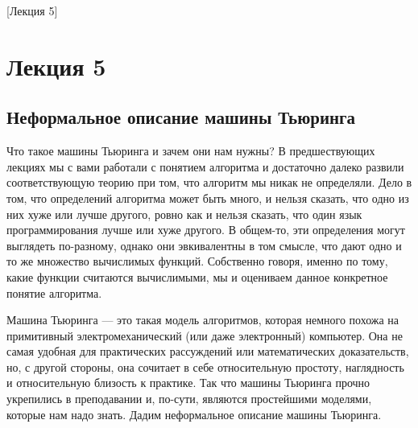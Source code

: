[Лекция 5]

\section{Лекция 5}

\subsection{Неформальное описание машины Тьюринга}

Что такое машины Тьюринга и зачем они нам нужны?
В предшествующих лекциях мы с вами работали с понятием алгоритма и достаточно далеко развили соответствующую теорию при том, что алгоритм мы никак не определяли.
Дело в том, что определений алгоритма может быть много, и нельзя сказать, что одно из них хуже или лучше другого, ровно как и нельзя сказать, что один язык программирования лучше или хуже другого.
В общем-то, эти определения могут выглядеть по-разному, однако они эвкивалентны в том смысле, что дают одно и то же множество вычислимых функций.
Собственно говоря, именно по тому, какие функции считаются вычислимыми, мы и оцениваем данное конкретное понятие алгоритма.

Машина Тьюринга --- это такая модель алгоритмов, которая немного похожа на примитивный электромеханический (или даже электронный) компьютер.
Она не самая удобная для практических рассуждений или математических доказательств, но, с другой стороны, она сочитает в себе относительную простоту, наглядность и относительную близость к практике.
Так что машины Тьюринга прочно укрепились в преподавании и, по-сути, являются простейшими моделями, которые нам надо знать.
Дадим неформальное описание машины Тьюринга.



